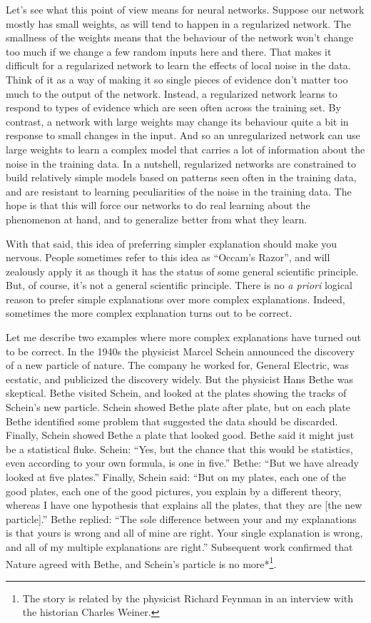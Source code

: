Let's see what this point of view means for neural networks. Suppose our network mostly has small weights, as will tend to happen in a regularized network. The smallness of the weights means that the behaviour of the network won't change too much if we change a few random inputs here and there. That makes it difficult for a regularized network to learn the effects of local noise in the data. Think of it as a way of making it so single pieces of evidence don't matter too much to the output of the network. Instead, a regularized network learns to respond to types of evidence which are seen often across the training set. By contrast, a network with large weights may change its behaviour quite a bit in response to small changes in the input. And so an unregularized network can use large weights to learn a complex model that carries a lot of information about the noise in the training data. In a nutshell, regularized networks are constrained to build relatively simple models based on patterns seen often in the training data, and are resistant to learning peculiarities of the noise in the training data. The hope is that this will force our networks to do real learning about the phenomenon at hand, and to generalize better from what they learn.


With that said, this idea of preferring simpler explanation should make you nervous. People sometimes refer to this idea as ``Occam's Razor'', and will zealously apply it as though it has the status of some general scientific principle. But, of course, it's not a general scientific principle. There is no \emph{a priori} logical reason to prefer simple explanations over more complex explanations. Indeed, sometimes the more complex explanation turns out to be correct.


Let me describe two examples where more complex explanations have turned out to be correct. In the 1940s the physicist Marcel Schein announced the discovery of a new particle of nature. The company he worked for, General Electric, was ecstatic, and publicized the discovery widely. But the physicist Hans Bethe was skeptical. Bethe visited Schein, and looked at the plates showing the tracks of Schein's new particle. Schein showed Bethe plate after plate, but on each plate Bethe identified some problem that suggested the data should be discarded. Finally, Schein showed Bethe a plate that looked good. Bethe said it might just be a statistical fluke. Schein: ``Yes, but the chance that this would be statistics, even according to your own formula, is one in five.'' Bethe: ``But we have already looked at five plates.'' Finally, Schein said: ``But on my plates, each one of the good plates, each one of the good pictures, you explain by a different theory, whereas I have one hypothesis that explains all the plates, that they are [the new particle].'' Bethe replied: ``The sole difference between your and my explanations is that yours is wrong and all of mine are right. Your single explanation is wrong, and all of my multiple explanations are right.'' Subsequent work confirmed that Nature agreed with Bethe, and Schein's particle is no more*\footnote{The story is related by the physicist Richard Feynman in an interview with the historian Charles Weiner.}.


